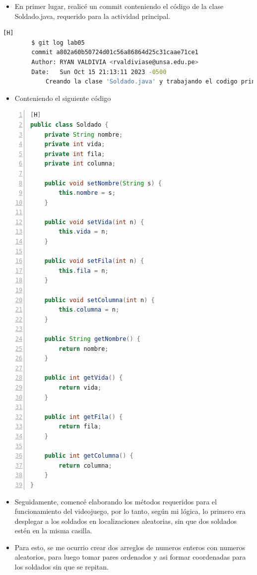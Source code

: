 \documentclass{article}
\begin{document}
	\begin{itemize}	
		\item En primer lugar, realicé un commit conteniendo el código de la clase Soldado.java, requerido para la actividad principal.
	\end{itemize}	
	\begin{lstlisting}[language=bash,caption={Comentando el código de Soldado.java}][H]
		$ git log lab05
		commit a802a60b50724d01c56a86864d25c31caae71ce1
		Author: RYAN VALDIVIA <rvaldiviase@unsa.edu.pe>
		Date:   Sun Oct 15 21:13:11 2023 -0500
			Creando la clase 'Soldado.java' y trabajando el codigo principal, inicializando el arreglo de objetos bidimensional
	\end{lstlisting}
	\begin{itemize}	
		\item Conteniendo el siguiente código
	\end{itemize}
	\begin{lstlisting}[language=java,caption={Clase Soldado}, numbers=left][H]
public class Soldado {
    private String nombre;
    private int vida;
    private int fila;
    private int columna;

    public void setNombre(String s) {
        this.nombre = s;
    }

    public void setVida(int n) {
        this.vida = n;
    }

    public void setFila(int n) {
        this.fila = n;
    }

    public void setColumna(int n) {
        this.columna = n;
    }

    public String getNombre() {
        return nombre;
    }

    public int getVida() {
        return vida;
    }

    public int getFila() {
        return fila;
    }

    public int getColumna() {
        return columna;
    }
}
	\end{lstlisting}
	\begin{itemize}	
		\item Seguidamente, comencé elaborando los métodos requeridos para el funcionamiento del videojuego, por lo tanto, según mi lógica, lo primero era desplegar a los soldados en localizaciones aleatorias, sin que dos soldados estén en la misma casilla.
		\item Para esto, se me ocurrio crear dos arreglos de numeros enteros con numeros aleatorios, para luego tomar pares ordenados y asi formar coordenadas para los soldados sin que se repitan.
	\end{itemize}
\end{document}
